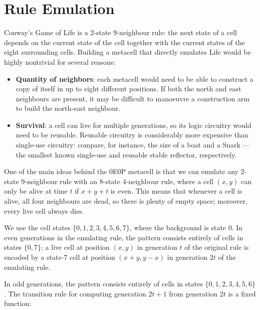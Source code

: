 

\section{Rule Emulation}\label{sec:0e0p_rule_emulation}

Conway's Game of Life is a 2-state 9-neighbour rule: the next state of a cell
depends on the current state of the cell together with the current states of
the eight surrounding cells. Building a metacell that directly emulates Life
would be highly nontrivial for several reasons:\smallskip

\begin{itemize}
	\item \textbf{Quantity of neighbors}: each metacell would need to be able to
	construct a copy of itself in up to eight different positions. If both the
	north and east neighbours are present, it may be difficult to manoeuvre a
	construction arm to build the north-east neighbour.\smallskip
	
	\item \textbf{Survival}: a cell can live for multiple generations, so its
	logic circuitry would need to be reusable. Reusable circuitry is considerably
	more expensive than single-use circuitry: compare, for instance, the size of
	a boat and a Snark --- the smallest known single-use and reusable stable
	reflector, respectively.\smallskip
\end{itemize}

One of the main ideas behind the 0E0P metacell is that we can emulate any
2-state 9-neighbour rule with an 8-state 4-neighbour rule, where a cell
$(x, y)$ can only be alive at time $t$ if $x + y + t$ is even. This means
that whenever a cell is alive, all four neighbours are dead, so there is
plenty of empty space; moreover, every live cell always dies.

We use the cell states $\{ 0, 1, 2, 3, 4, 5, 6, 7 \}$, where the background
is state 0. In even generations in the emulating rule, the pattern consists
entirely of cells in states $\{ 0, 7 \}$; a live cell at position $(x, y)$
in generation $t$ of the original rule is encoded by a state-$7$ cell at
position $(x + y, y - x)$ in generation $2t$ of the emulating rule.

In odd generations, the pattern consists entirely of cells in states
$\{ 0, 1, 2, 3, 4, 5, 6 \}$. The transition rule for computing generation
$2t + 1$ from generation $2t$ is a fixed function:

